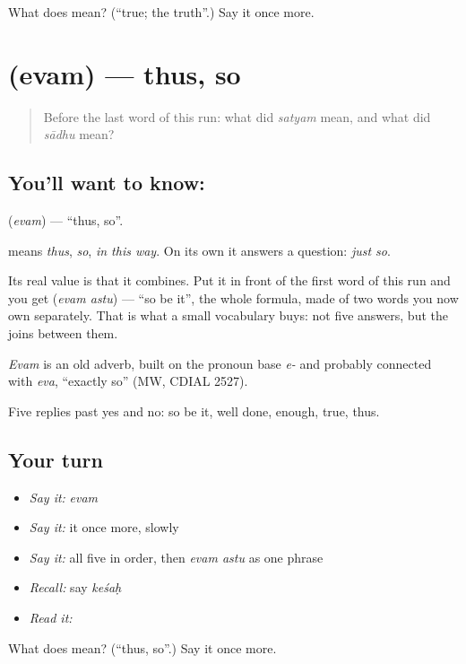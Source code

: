 \begin{tcolorbox}[breakable,colback=teal!4,colframe=teal!35!black,title={Before you move on}]
What does  mean? (\textquotedblleft{}true; the truth\textquotedblright{}.) Say it once more.
\end{tcolorbox}
\section[\texorpdfstring{\sk{एवम्} (evam)}{एवम् (evam)}]{ (evam) — thus, so}

\label{lesson:SA-C27-thus}



\begin{quote}
Before the last word of this run: what did \emph{satyam} mean, and what did \emph{sādhu} mean?
\end{quote}

\subsection*{You'll want to know: }
\textbf{} (\emph{evam}) — \textquotedblleft{}thus, so\textquotedblright{}.

\textbf{} means \emph{thus}, \emph{so}, \emph{in this way}. On its own it answers a question: \emph{just so}.

Its real value is that it combines. Put it in front of the first word of this run and you get \textbf{ } (\emph{evam astu}) — \textquotedblleft{}so be it\textquotedblright{}, the whole formula, made of two words you now own separately. That is what a small vocabulary buys: not five answers, but the joins between them.

\begin{cousinweb}
\emph{Evam} is an old adverb, built on the pronoun base \emph{e-} and probably connected with \emph{eva}, \textquotedblleft{}exactly so\textquotedblright{} (MW, CDIAL 2527).
\end{cousinweb}

\begin{grammarlens}[title={What you've built}]
Five replies past yes and no: so be it, well done, enough, true, thus.
\end{grammarlens}

\subsection*{Your turn}
\begin{itemize}
\raggedright
  \item \emph{Say it:} \emph{evam}
  \item \emph{Say it:} it once more, slowly
  \item \emph{Say it:} all five in order, then \emph{evam astu} as one phrase
  \item \emph{Recall:} say \emph{keśaḥ}
  \item \emph{Read it:} \textbf{}
\end{itemize}

\begin{tcolorbox}[breakable,colback=teal!4,colframe=teal!35!black,title={Before you move on}]
What does  mean? (\textquotedblleft{}thus, so\textquotedblright{}.) Say it once more.
\end{tcolorbox}
